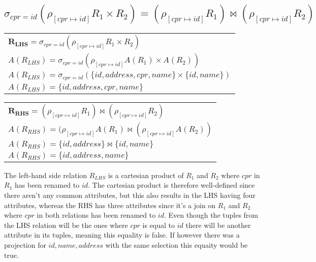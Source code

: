 \subsection{\normalsize{$\sigma_{cpr=id}(\rho_{[cpr \mapsto id]}R_1 \times R_2) = (\rho_{[cpr \mapsto id]}R_1) \Join (\rho_{[cpr \mapsto id]}R_2)$}}

\begin{table}[ht]
	\begin{tabular}{|l|}
		 $\bm{R_{LHS}} = \sigma_{cpr=id}(\rho_{[cpr \mapsto id]}R_1 \times R_2)$ \\[0.2cm]
		 $A(R_{LHS}) = \sigma_{cpr=id}(\rho_{[cpr \mapsto id]}A(R_1) \times A(R_2))$ \\[0.2cm]
		 $A(R_{LHS}) = \sigma_{cpr=id}(\{id, address, cpr, name\} \times \{id, name\})$ \\[0.2cm]
		 $A(R_{LHS}) = \{id, address, cpr, name\}$
	\end{tabular}
\end{table}

\begin{table}[ht]
	\begin{tabular}{|l|}
		 $\bm{R_{RHS}} = (\rho_{[cpr \mapsto id]}R_1) \Join (\rho_{[cpr \mapsto id]}R_2)$ \\[0.2cm]
		 $A(R_{RHS}) = (\rho_{[cpr \mapsto id]}A(R_1) \Join (\rho_{[cpr \mapsto id]}A(R_2))$ \\[0.2cm]
		 $A(R_{RHS}) = \{id, address\} \Join \{id, name\}$ \\[0.2cm]
		 $A(R_{RHS}) = \{id, address, name\}$
	\end{tabular}
\end{table}
\FloatBarrier

The left-hand side relation $R_{LHS}$ is a cartesian product of $R_1$ and $R_2$ where $cpr$ in $R_1$ has been renamed to $id$.
The cartesian product is therefore well-defined since there aren't any common attributes, but this also results in the LHS having four attributes, whereas the RHS has three attributes since it's a join on $R_1$ and $R_2$ where $cpr$ in both relations has been renamed to $id$. Even though the tuples from the LHS relation will be the ones where $cpr$ is equal to $id$ there will be another attribute in its tuples, meaning this equality is false.
If however there was a projection for $id, name, address$ with the same selection this equaity would be true.\\\\

